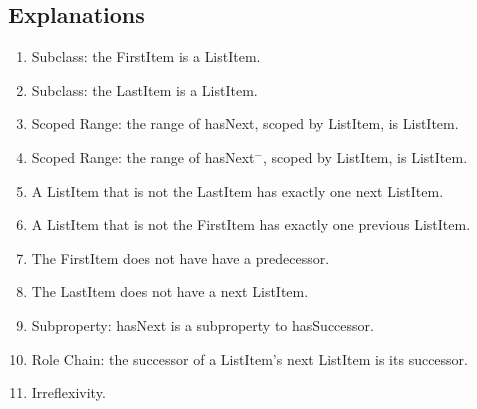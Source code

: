 \subsection{Explanations}
\label{exp:Sequence}
\begin{enumerate}
\item Subclass: the \textsf{FirstItem} is a \textsf{ListItem}.
\item Subclass: the \textsf{LastItem} is a \textsf{ListItem}.
\item Scoped Range: the range of \textsf{hasNext}, scoped by \textsf{ListItem}, is \textsf{ListItem}.
\item Scoped Range: the range of \textsf{hasNext}$^-$, scoped by \textsf{ListItem}, is \textsf{ListItem}.
\item A \textsf{ListItem} that is not the \textsf{LastItem} has exactly one next \textsf{ListItem}.
\item A \textsf{ListItem} that is not the \textsf{FirstItem} has exactly one previous \textsf{ListItem}.
\item The \textsf{FirstItem} does not have have a predecessor.
\item The \textsf{LastItem} does not have a next \textsf{ListItem}.
\item Subproperty: \textsf{hasNext} is a subproperty to \textsf{hasSuccessor}.
\item Role Chain: the successor of a \textsf{ListItem}'s next \textsf{ListItem} is its successor.
\item Irreflexivity.
\end{enumerate}

\newpage

